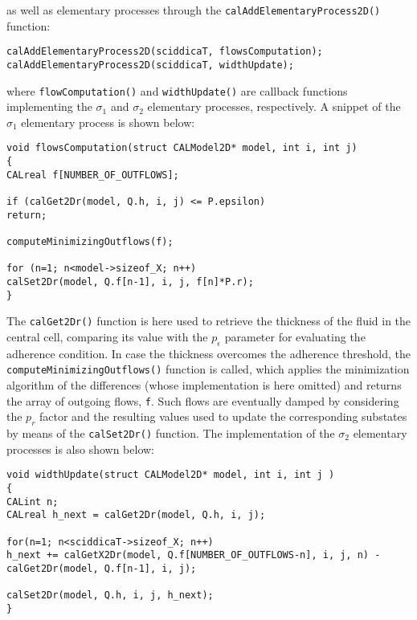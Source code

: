 \noindent as well as elementary processes through the
\verb'calAddElementaryProcess2D()' function:

\begin{lstlisting}[basicstyle=\footnotesize, numbers=none]
calAddElementaryProcess2D(sciddicaT, flowsComputation);
calAddElementaryProcess2D(sciddicaT, widthUpdate);
\end{lstlisting}

\noindent where \verb'flowComputation()' and \verb'widthUpdate()'
are callback functions implementing the $\sigma_1$ and $\sigma_2$
elementary processes, respectively. A snippet of the $\sigma_1$
elementary process is shown below:

\begin{lstlisting}[basicstyle=\footnotesize, numbers=none]
void flowsComputation(struct CALModel2D* model, int i, int j)
{
CALreal f[NUMBER_OF_OUTFLOWS];

if (calGet2Dr(model, Q.h, i, j) <= P.epsilon)
return;

computeMinimizingOutflows(f);

for (n=1; n<model->sizeof_X; n++)
calSet2Dr(model, Q.f[n-1], i, j, f[n]*P.r);
}
\end{lstlisting}

\noindent The \verb'calGet2Dr()' function is here used to retrieve
the thickness of the fluid in the central cell, comparing its value
with the $p_\epsilon$ parameter for evaluating the adherence
condition. In case the thickness overcomes the adherence threshold,
the \verb'computeMinimizingOutflows()' function is called, which
applies the minimization algorithm of the differences (whose
implementation is here omitted) and returns the array of outgoing
flows, \verb'f'. Such flows are eventually damped by considering the
$p_r$ factor and the resulting values used to update the
corresponding substates by means of the \verb'calSet2Dr()'
function. The implementation of the $\sigma_2$ elementary processes
is also shown below:

\begin{lstlisting}[basicstyle=\footnotesize, numbers=none]
void widthUpdate(struct CALModel2D* model, int i, int j )
{
CALint n;
CALreal h_next = calGet2Dr(model, Q.h, i, j);

for(n=1; n<sciddicaT->sizeof_X; n++)
h_next += calGetX2Dr(model, Q.f[NUMBER_OF_OUTFLOWS-n], i, j, n) - calGet2Dr(model, Q.f[n-1], i, j);

calSet2Dr(model, Q.h, i, j, h_next);
}
\end{lstlisting}

